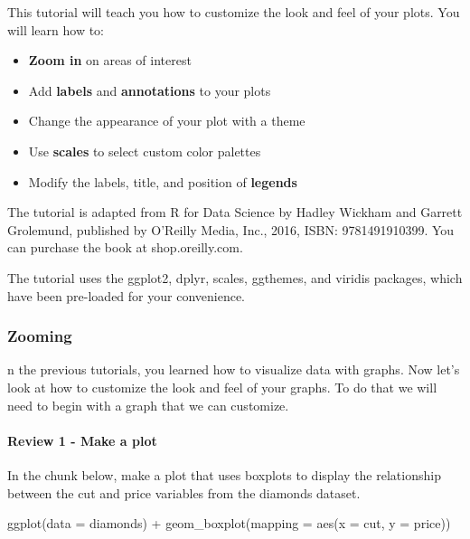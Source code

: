 \documentclass[
]{article}
\newenvironment{Shaded}{\begin{snugshade}}{\end{snugshade}}
\newcommand{\AttributeTok}[1]{\textcolor[rgb]{0.77,0.63,0.00}{#1}}
\newcommand{\FunctionTok}[1]{\textcolor[rgb]{0.00,0.00,0.00}{#1}}
\newcommand{\NormalTok}[1]{#1}
\newcommand{\SpecialCharTok}[1]{\textcolor[rgb]{0.00,0.00,0.00}{#1}}
\providecommand{\tightlist}{%
  \setlength{\itemsep}{0pt}\setlength{\parskip}{0pt}}
\begin{document}
This tutorial will teach you how to customize the look and feel of your
plots. You will learn how to:

\begin{itemize}
\tightlist
\item
  \textbf{Zoom in} on areas of interest
\item
  Add \textbf{labels} and \textbf{annotations} to your plots
\item
  Change the appearance of your plot with a theme
\item
  Use \textbf{scales} to select custom color palettes
\item
  Modify the labels, title, and position of \textbf{legends}
\end{itemize}

The tutorial is adapted from R for Data Science by Hadley Wickham and
Garrett Grolemund, published by O'Reilly Media, Inc., 2016, ISBN:
9781491910399. You can purchase the book at shop.oreilly.com.

The tutorial uses the ggplot2, dplyr, scales, ggthemes, and viridis
packages, which have been pre-loaded for your convenience.

\hypertarget{zooming}{%
\subsubsection{Zooming}\label{zooming}}

n the previous tutorials, you learned how to visualize data with graphs.
Now let's look at how to customize the look and feel of your graphs. To
do that we will need to begin with a graph that we can customize.

\hypertarget{review-1---make-a-plot}{%
\paragraph{Review 1 - Make a plot}\label{review-1---make-a-plot}}

In the chunk below, make a plot that uses boxplots to display the
relationship between the cut and price variables from the diamonds
dataset.

\begin{Shaded}
\begin{Highlighting}[]
\FunctionTok{ggplot}\NormalTok{(}\AttributeTok{data =}\NormalTok{ diamonds) }\SpecialCharTok{+}
  \FunctionTok{geom\_boxplot}\NormalTok{(}\AttributeTok{mapping =} \FunctionTok{aes}\NormalTok{(}\AttributeTok{x =}\NormalTok{ cut, }\AttributeTok{y =}\NormalTok{ price))}
\end{Highlighting}
\end{Shaded}
\end{document}

